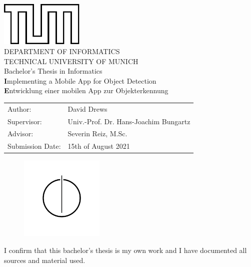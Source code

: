 \documentclass[
			   fontsize=11pt,
               paper=a4,
               bibliography=totoc,
               idxtotoc,
               headsepline,
               footsepline,
               footinclude=false,
               BCOR=12mm,
               DIV=13,
               openany,   %
               oneside    %
               ]
               {scrbook}
\def\doctype{Bachelor's Thesis\xspace}
\def\studyProgram{Informatics}
\def\title{Implementing a Mobile App for Object Detection}
\def\titleGer{Entwicklung einer mobilen App zur Objekterkennung}
\def\author{David Drews}
\def\supervisor{Univ.-Prof. Dr. Hans-Joachim Bungartz}
\def\advisor{Severin Reiz, M.Sc.}
\def\date{15th of August 2021}
\begin{document}
\def\bcorcor{0.15cm}
\addtolength{\hoffset}{\bcorcor}
\thispagestyle{empty}
\vspace{10mm}
\begin{center}
    \includegraphics[width=4cm]{templateStuff/tumlogo.pdf}\\[5mm]
	\huge DEPARTMENT OF INFORMATICS\\[5mm]
	\large TECHNICAL UNIVERSITY OF MUNICH\\[24mm]
	{\Large \doctype in \studyProgram}\\[20mm]
	{\LARGE\textbf \title}\\[10mm]
	{\LARGE\textbf \titleGer}\\[10mm]
	\begin{tabular}{ll}
		\Large Author:      	& \Large \author \\[2mm]
		\Large Supervisor:  	& \Large \supervisor\\[2mm]
		\Large Advisor:			& \Large \advisor\\[2mm]
		\Large Submission Date:       		& \Large \date
	\end{tabular}
	\vspace{-1mm}
	\begin{figure}[h!]
		\centering
		\includegraphics[width=4cm]{templateStuff/informat.pdf}
	\end{figure}
\end{center}

\addtolength{\hoffset}{\bcorcor}
\newpage


\cleardoubleemptypage

\thispagestyle{empty}
\vspace*{0.7\textheight}
\noindent
I confirm that this \MakeLowercase{\doctype} is my own work and I have documented all sources and material used.\\
\end{document}
